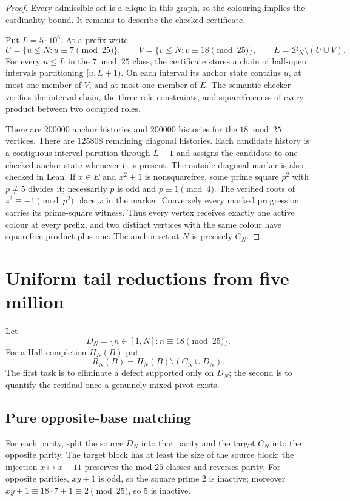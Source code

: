 \documentclass[11pt]{article}
\theoremstyle{definition}
\newcommand{\CN}{C_N}
\newcommand{\DN}{D_N}
\newcommand{\RN}{R_N}
\newcommand{\FiveMillion}{5\cdot10^6}
\begin{document}
\begin{proof}
Every admissible set is a clique in this graph, so the colouring implies the
cardinality bound.  It remains to describe the checked certificate.

Put $L=\FiveMillion$.  At a prefix write
\[
 U=\{u\leq N:u\equiv7\pmod {25}\},\qquad
 V=\{v\leq N:v\equiv18\pmod {25}\},\qquad
 E=\mathcal D_N\setminus(U\cup V).
\]
For every $u\leq L$ in the $7\bmod25$ class, the certificate stores a chain
of half-open intervals partitioning $[u,L+1)$.  On each interval its anchor
state contains $u$, at most one member of $V$, and at most one member of
$E$.  The semantic checker verifies the interval chain, the three role
constraints, and squarefreeness of every product between two occupied roles.

There are $200000$ anchor histories and $200000$ histories for the
$18\bmod25$ vertices.  There are $125808$ remaining diagonal histories.
Each candidate history is a contiguous interval partition through $L+1$ and
assigns the candidate to one checked anchor state whenever it is present.
The outside diagonal marker is also checked in Lean.  If $x\in E$ and
$x^2+1$ is nonsquarefree, some prime square $p^2$ with $p\neq5$ divides it;
necessarily $p$ is odd and $p\equiv1\pmod4$.  The verified roots of
$z^2\equiv-1\pmod {p^2}$ place $x$ in the marker.  Conversely every marked
progression carries its prime-square witness.  Thus every vertex receives
exactly one active colour at every
prefix, and two distinct vertices with the same colour have squarefree
product plus one.  The anchor set at $N$ is precisely $\CN$.
\end{proof}

\section{Uniform tail reductions from five million}

Let
\[
  \DN=\{n\in[1,N]:n\equiv18\pmod {25}\}.
\]
For a Hall completion $H_N(B)$ put
\[
  \RN(B)=H_N(B)\setminus(\CN\cup\DN).
\]
The first task is to eliminate a defect supported only on $\DN$; the second
is to quantify the residual once a genuinely mixed pivot exists.

\subsection{Pure opposite-base matching}

For each parity, split the source $\DN$ into that parity and the target
$\CN$ into the opposite parity.  The target block has at least the size of
the source block: the injection $x\mapsto x-11$ preserves the mod-$25$
classes and reverses parity.  For opposite parities, $xy+1$ is odd, so the
square prime $2$ is inactive; moreover
$xy+1\equiv18\cdot7+1\equiv2\pmod {25}$, so $5$ is inactive.
\end{document}

